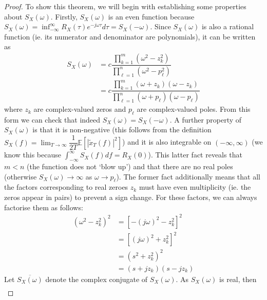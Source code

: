 \documentclass[11pt]{report} %
\begin{document}
\begin{proof}
To show this theorem, we will begin with establishing some properties about $S_{X}\left(\omega\right)$. Firstly, $S_{X}\left(\omega\right)$ is an even function because $S_{X}\left(\omega\right) = \inf_{-\infty}^{\infty}R_{X}\left(\tau\right)e^{-j\omega\tau}d\tau = S_{X}\left(-\omega\right)$. Since $S_{X}\left(\omega\right)$ is also a rational function (ie. its numerator and denominator are polynomials), it can be written as
\begin{align}
S_{X}\left(\omega\right) &= c\dfrac{\prod_{k = 1}^{m}\left(\omega^{2} - z_{k}^{2}\right)}{\prod_{\ell = 1}^{n}\left(\omega^{2} - p_{\ell}^{2}\right)} \\
&= c\dfrac{\prod_{k = 1}^{m}\left(\omega + z_{k}\right)\left(\omega - z_{k}\right)}{\prod_{\ell = 1}^{n}\left(\omega + p_{\ell}\right)\left(\omega - p_{\ell}\right)}
\end{align}
where $z_{k}$ are complex-valued zeros and $p_{\ell}$ are complex-valued poles. From this form we can check that indeed $S_{X}\left(\omega\right) = S_{X}\left(-\omega\right)$. A further property of $S_{X}\left(\omega\right)$ is that it is non-negative (this follows from the definition $S_{X}\left(f\right) = \lim_{T\to\infty}\dfrac{1}{2T}\mathbb{E}\left[\left|\widetilde{x}_{T}\left(f\right)\right|^{2}\right]$) and it is also integrable on $\left(-\infty, \infty\right)$ (we know this because $\int_{-\infty}^{\infty}S_{X}\left(f\right)df = R_{X}\left(0\right)$). This latter fact reveals that $m < n$ (the function does not `blow up') and that there are no real poles (otherwise $S_{X}\left(\omega\right) \to \infty$ as $\omega \to p_{\ell}$). The former fact additionally means that all the factors corresponding to real zeroes $z_{k}$ must have even multiplicity (ie. the zeros appear in pairs) to prevent a sign change. For these factors, we can always factorise them as follows:
\begin{align}
\left(\omega^{2} - z_{k}^{2}\right)^{2} &= \left[-\left(j\omega\right)^{2} - z_{k}^{2}\right]^{2} \\
&= \left[\left(j\omega\right)^{2} + z_{k}^{2}\right]^{2} \\
&= \left(s^{2} + z_{k}^{2}\right)^{2} \\
&= \left(s + jz_{k}\right)\left(s - jz_{k}\right)
\end{align}
Let $\overline{S_{X}\left(\omega\right)}$ denote the complex conjugate of $S_{X}\left(\omega\right)$. As $S_{X}\left(\omega\right)$ is real, then
\begin{align}

\end{align}
\end{proof}
\end{document}
